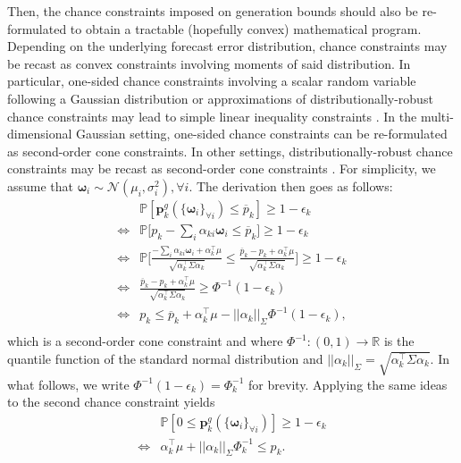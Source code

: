 \documentclass{article}
\begin{document}
Then, the chance constraints imposed on generation bounds should also be re-formulated to obtain a tractable (hopefully convex) mathematical program. Depending on the underlying forecast error distribution, chance constraints may be recast as convex constraints involving moments of said distribution. In particular, one-sided chance constraints involving a scalar random variable following a Gaussian distribution or approximations of distributionally-robust chance constraints may lead to simple linear inequality constraints \cite{Dvorkin2020}. In the multi-dimensional Gaussian setting, one-sided chance constraints can be re-formulated as second-order cone constraints. In other settings, distributionally-robust chance constraints may be recast as second-order cone constraints \cite{Xie2018}. For simplicity, we assume that $\boldsymbol{\omega}_i \sim \mathcal{N}(\mu_i, \sigma_i^2), \forall i$. The derivation then goes as follows:
\begin{align*}
&\mathbb{P}[\mathbf{p}_k^g(\{\boldsymbol{\omega}_i\}_{\forall i}) \le \overline{p}_k] \ge 1 - \epsilon_k\\
\Leftrightarrow &\mathbb{P}\Big[p_k - \sum_i \alpha_{ki} \boldsymbol{\omega}_i \le \overline{p}_k\Big] \ge 1 - \epsilon_k\\
\Leftrightarrow &\mathbb{P}\Big[\frac{- \sum_i \alpha_{ki} \boldsymbol{\omega}_i + \alpha_k^\top \mu}{\sqrt{\alpha_k^\top \Sigma \alpha_k}} \le \frac{\overline{p}_k - p_k + \alpha_k^\top \mu}{\sqrt{\alpha_k^\top \Sigma \alpha_k}}\Big] \ge 1 - \epsilon_k\\
\Leftrightarrow &\frac{\overline{p}_k - p_k + \alpha_k^\top \mu}{\sqrt{\alpha_k^\top \Sigma \alpha_k}} \ge \Phi^{-1}(1 - \epsilon_k)\\
\Leftrightarrow &p_k \le \overline{p}_k + \alpha_k^\top \mu - ||\alpha_k||_{\Sigma} \Phi^{-1}(1 - \epsilon_k),\\
\end{align*}
which is a second-order cone constraint and where $\Phi^{-1}: (0, 1) \rightarrow \mathbb{R}$ is the quantile function of the standard normal distribution and $||\alpha_k||_{\Sigma} = \sqrt{\alpha_k^\top \Sigma \alpha_k}$. In what follows, we write $\Phi^{-1}(1 - \epsilon_k) = \Phi_k^{-1}$ for brevity. Applying the same ideas to the second chance constraint yields
\begin{align*}
&\mathbb{P}[0 \le \mathbf{p}_k^g(\{\boldsymbol{\omega}_i\}_{\forall i})] \ge 1 - \epsilon_k\\
\Leftrightarrow & \alpha_k^\top \mu + ||\alpha_k||_{\Sigma} \Phi_k^{-1} \le p_k.
\end{align*}
\end{document}
